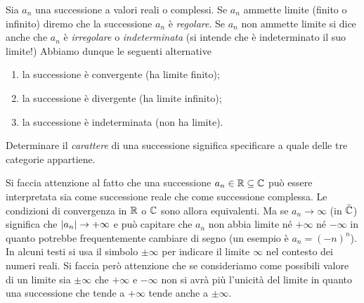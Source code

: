\begin{definition}
\mymark{***}
Sia $a_n$ una successione a valori reali o complessi.
Se $a_n$ ammette limite (finito o infinito)
diremo che la successione $a_n$ è \emph{regolare}.
%
%
%
Se $a_n$ non ammette limite
si dice anche che $a_n$ è \emph{irregolare}
%
o \emph{indeterminata}
%
%
(si intende che è indeterminato il suo limite!)
Abbiamo dunque le seguenti alternative
\begin{enumerate}
 \item la successione è convergente (ha limite finito);
 \item la successione è divergente (ha limite infinito);
 \item la successione è indeterminata (non ha limite).
\end{enumerate}
Determinare il \emph{carattere}
%
%
di una successione
significa specificare a quale delle tre categorie appartiene.
\end{definition}

Si faccia attenzione al fatto che una successione $a_n\in \mathbb R \subseteq \mathbb C$
può essere interpretata sia come successione reale che come successione complessa.
Le condizioni di convergenza in $\mathbb R$ o $\mathbb C$ sono allora equivalenti. Ma
se $a_n \to \infty$ (in $\bar {\mathbb C}$) significa che ${\left|a_n\right|}\to +\infty$
e può capitare che $a_n$ non abbia limite né $+\infty$
né $-\infty$ in quanto potrebbe frequentemente cambiare di segno
(un esempio è $a_n = (-n)^n$).
In alcuni testi si usa il simbolo $\pm \infty$ per indicare
il limite $\infty$ nel contesto dei numeri reali. Si faccia però
attenzione che se consideriamo come possibili valore di un limite
sia $\pm\infty$ che $+\infty$ e $-\infty$ non si avrà più l'unicità
del limite in quanto una successione che tende a $+\infty$
tende anche a $\pm \infty$.

